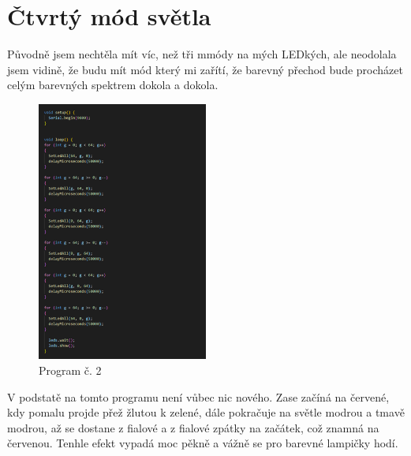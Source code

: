 \section{Čtvrtý mód světla}
Původně jsem nechtěla mít víc, než tři mmódy na mých LEDkých, ale neodolala jsem vidině, že budu mít mód který mi zařítí, že barevný přechod bude procházet celým barevných spektrem  dokola a dokola. 

\begin{figure}[htbp]
	\centering
	\includegraphics[width=0.5\textwidth]{img/015 img/program4-duha.png}
	\caption{Program č. 2}
\end{figure}

V podstatě na tomto programu není vůbec nic nového. Zase začíná na červené, kdy pomalu projde přež žlutou k zelené, dále pokračuje na světle modrou a tmavě modrou, až se dostane z fialové a z fialové zpátky na začátek, což znamná na červenou. Tenhle efekt vypadá moc pěkně a vážně se pro barevné lampičky hodí. 



\newpage